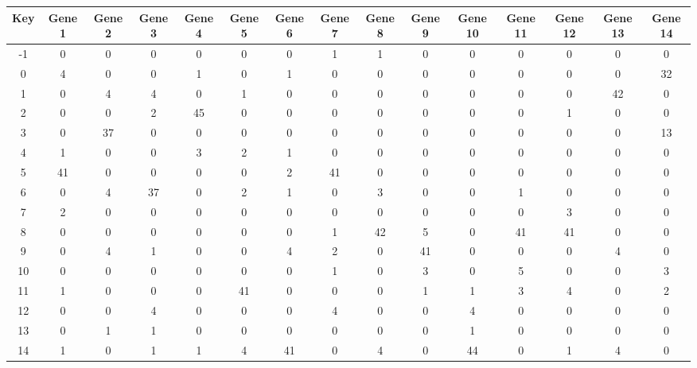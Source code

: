 \begin{tabular}{|c|c|c|c|c|c|c|c|c|c|c|c|c|c|c|}
\hline
Key & Gene 1 & Gene 2 & Gene 3 & Gene 4 & Gene 5 & Gene 6 & Gene 7 & Gene 8 & Gene 9 & Gene 10 & Gene 11 & Gene 12 & Gene 13 & Gene 14 \\
\hline
-1 & 0 & 0 & 0 & 0 & 0 & 0 & 1 & 1 & 0 & 0 & 0 & 0 & 0 & 0 \\
0 & 4 & 0 & 0 & 1 & 0 & 1 & 0 & 0 & 0 & 0 & 0 & 0 & 0 & 32 \\
1 & 0 & 4 & 4 & 0 & 1 & 0 & 0 & 0 & 0 & 0 & 0 & 0 & 42 & 0 \\
2 & 0 & 0 & 2 & 45 & 0 & 0 & 0 & 0 & 0 & 0 & 0 & 1 & 0 & 0 \\
3 & 0 & 37 & 0 & 0 & 0 & 0 & 0 & 0 & 0 & 0 & 0 & 0 & 0 & 13 \\
4 & 1 & 0 & 0 & 3 & 2 & 1 & 0 & 0 & 0 & 0 & 0 & 0 & 0 & 0 \\
5 & 41 & 0 & 0 & 0 & 0 & 2 & 41 & 0 & 0 & 0 & 0 & 0 & 0 & 0 \\
6 & 0 & 4 & 37 & 0 & 2 & 1 & 0 & 3 & 0 & 0 & 1 & 0 & 0 & 0 \\
7 & 2 & 0 & 0 & 0 & 0 & 0 & 0 & 0 & 0 & 0 & 0 & 3 & 0 & 0 \\
8 & 0 & 0 & 0 & 0 & 0 & 0 & 1 & 42 & 5 & 0 & 41 & 41 & 0 & 0 \\
9 & 0 & 4 & 1 & 0 & 0 & 4 & 2 & 0 & 41 & 0 & 0 & 0 & 4 & 0 \\
10 & 0 & 0 & 0 & 0 & 0 & 0 & 1 & 0 & 3 & 0 & 5 & 0 & 0 & 3 \\
11 & 1 & 0 & 0 & 0 & 41 & 0 & 0 & 0 & 1 & 1 & 3 & 4 & 0 & 2 \\
12 & 0 & 0 & 4 & 0 & 0 & 0 & 4 & 0 & 0 & 4 & 0 & 0 & 0 & 0 \\
13 & 0 & 1 & 1 & 0 & 0 & 0 & 0 & 0 & 0 & 1 & 0 & 0 & 0 & 0 \\
14 & 1 & 0 & 1 & 1 & 4 & 41 & 0 & 4 & 0 & 44 & 0 & 1 & 4 & 0 \\
\hline
\end{tabular}